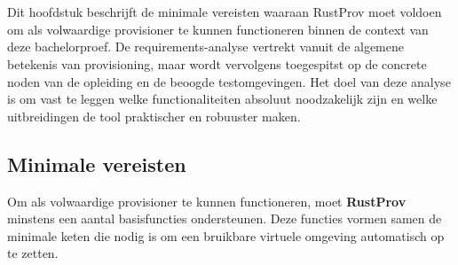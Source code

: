\chapter{}
\label{ch:requirements-analyse}

Dit hoofdstuk beschrijft de minimale vereisten waaraan RustProv moet voldoen om als volwaardige provisioner te kunnen functioneren binnen de context van deze bachelorproef. De requirements-analyse vertrekt vanuit de algemene betekenis van provisioning, maar wordt vervolgens toegespitst op de concrete noden van de opleiding en de beoogde testomgevingen. Het doel van deze analyse is om vast te leggen welke functionaliteiten absoluut noodzakelijk zijn en welke uitbreidingen de tool praktischer en robuuster maken.

\section{Minimale vereisten}
Om als volwaardige provisioner te kunnen functioneren, moet \textbf{RustProv} minstens een aantal basisfuncties ondersteunen. Deze functies vormen samen de minimale keten die nodig is om een bruikbare virtuele omgeving automatisch op te zetten.

